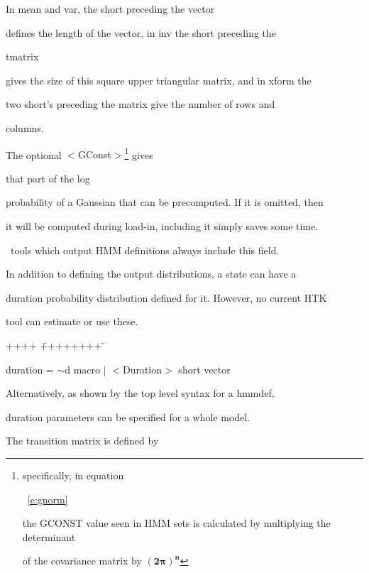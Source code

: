 \noindent


In {\sf mean} and {\sf var}, the {\sf short} preceding the {\sf vector}


defines the length of the vector, in {\sf inv} the {\sf short} preceding the {\sf


tmatrix} gives the size of this square upper triangular matrix, and in {\sf xform} the


two {\sf short}'s preceding the {\sf matrix} give the number of rows and


columns. 


The optional {\sf $<$GConst$>$}\footnote{specifically, in equation 


~\ref{e:gnorm} 


the GCONST value seen in HMM sets is calculated by multiplying the determinant 


of the covariance matrix by $\bm{(2 \pi)^n}$}  gives 


that part of the log


probability of a Gaussian that can be precomputed.  If it is omitted, then


it will be computed during load-in, including it simply saves some time.


\HTK\ tools which output HMM definitions always include this field.





In addition to defining the output distributions, a state can have a


duration probability distribution defined for it. However, no current HTK


tool can estimate or use these.


{\sf


\begin{tabbing}


++++ \= ++++++++ \=  \kill


\>   duration = \> $\sim$d macro $|$ $<$Duration$>$ short vector


\end{tabbing}


}


\noindent


Alternatively, as shown by the top level syntax for a {\sf hmmdef},


duration parameters can be specified for a whole model.





The transition matrix is defined by


